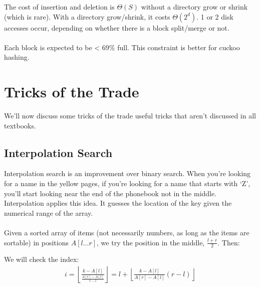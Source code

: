 \documentclass[]{article}
\theoremstyle{definition}
\begin{document}
			The cost of insertion and deletion is $\Theta(S)$ without a directory grow or shrink (which is rare). With a directory grow/shrink, it costs $\Theta(2^d)$. 1 or 2 disk accesses occur, depending on whether there is a block split/merge or not.
			\\ \\
			Each block is expected to be < 69\% full. This constraint is better for cuckoo hashing.

	\section{Tricks of the Trade}
		We'll now discuss some tricks of the trade \textendash{} useful tricks that aren't discussed in all textbooks.

		\subsection{Interpolation Search}
			Interpolation search is an improvement over binary search. When you're looking for a name in the yellow pages, if you're looking for a name that starts with `Z', you'll start looking near the end of the phonebook \textendash{} not in the middle. Interpolation applies this idea. It guesses the location of the key given the numerical range of the array.
			\\ \\
			Given a sorted array of items (not necessarily numbers, as long as the items are sortable) in positions $A[l \ldots r]$, we try the position in the middle, $\frac{l + r}{2}$. Then: \\
			\begin{algorithm}[H]
			\end{algorithm}

			We will check the index:
			\begin{align*}
				i = \left \lfloor \frac{k - A[l]}{\frac{A[r] - A[l]}{r - l}} \right \rfloor = l + \left \lfloor \frac{k - A[l]}{A[r] - A[l]} (r - l) \right \rfloor
			\end{align*}
\end{document}

